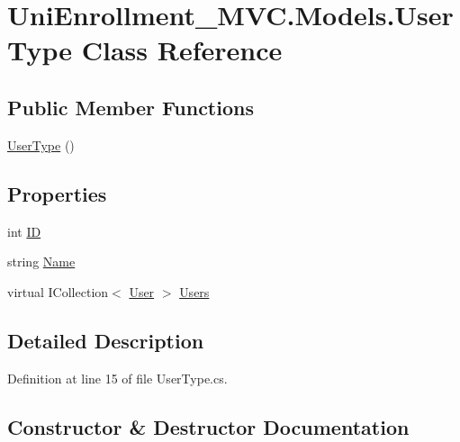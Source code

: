 \hypertarget{class_uni_enrollment___m_v_c_1_1_models_1_1_user_type}{}\section{Uni\+Enrollment\+\_\+\+M\+V\+C.\+Models.\+User\+Type Class Reference}
\label{class_uni_enrollment___m_v_c_1_1_models_1_1_user_type}
\subsection*{Public Member Functions}
\begin{DoxyCompactItemize}
\item 
\hyperlink{class_uni_enrollment___m_v_c_1_1_models_1_1_user_type_aac5f44c2218f0212acb9fc819c2b879a}{User\+Type} ()
\end{DoxyCompactItemize}
\subsection*{Properties}
\begin{DoxyCompactItemize}
\item 
int \hyperlink{class_uni_enrollment___m_v_c_1_1_models_1_1_user_type_acf9a3b3fdf3f050f1fb9a63983ca4075}{ID}
\item 
string \hyperlink{class_uni_enrollment___m_v_c_1_1_models_1_1_user_type_a5606ad367c45e5c2fefb992377b6b55a}{Name}
\item 
virtual I\+Collection$<$ \hyperlink{class_uni_enrollment___m_v_c_1_1_models_1_1_user}{User} $>$ \hyperlink{class_uni_enrollment___m_v_c_1_1_models_1_1_user_type_a6520e4f4b273c006fdf1926e51b4816b}{Users}
\end{DoxyCompactItemize}


\subsection{Detailed Description}


Definition at line 15 of file User\+Type.\+cs.



\subsection{Constructor \& Destructor Documentation}
